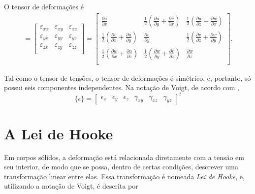 O tensor de deformações é
\begin{gather}
    [\mathbf{\epsilon}] = 
    \begin{bmatrix}
        \varepsilon_{xx} & \varepsilon_{xy} & \varepsilon_{xz} \\
        \varepsilon_{yx} & \varepsilon_{yy} & \varepsilon_{yz} \\
        \varepsilon_{zx} & \varepsilon_{zy} & \varepsilon_{zz} \\
    \end{bmatrix}
        =
    \begin{bmatrix}
        \frac{\partial u}{\partial x} & \frac{1}{2} \left(\frac{\partial u}{\partial y}+\frac{\partial v}{\partial x}\right) & \frac{1}{2} \left(\frac{\partial u}{\partial z}+\frac{\partial w}{\partial x}\right) \\
        \frac{1}{2} \left(\frac{\partial v}{\partial x}+\frac{\partial u}{\partial y}\right) & \frac{\partial v}{\partial y} & \frac{1}{2} \left(\frac{\partial v}{\partial z}+\frac{\partial w}{\partial y}\right) \\
        \frac{1}{2} \left(\frac{\partial w}{\partial x}+\frac{\partial u}{\partial z}\right) & \frac{1}{2} \left(\frac{\partial w}{\partial y}+\frac{\partial v}{\partial z}\right) & \frac{\partial w}{\partial z} \\
    \end{bmatrix}.
    \label{eq:tensor_de_deformacoes}
\end{gather}

Tal como o tensor de tensões, o tensor de deformações é simétrico, e, portanto, só possui seis componentes independentes. Na notação de Voigt, de acordo com ,
\begin{equation}
    \{\epsilon\} = \begin{bmatrix}
        \epsilon_x & \epsilon_y & \epsilon_z & \gamma_{xy} & \gamma_{xz} & \gamma_{yz}
    \end{bmatrix}^t
\end{equation}

\section{A Lei de Hooke}

Em corpos sólidos, a deformação está relacionada diretamente com a tensão em seu interior, de modo que se possa, dentro de certas condições, descrever uma transformação linear entre elas. Essa transformação é nomeada \emph{Lei de Hooke}, e, utilizando a notação de Voigt, é descrita por

